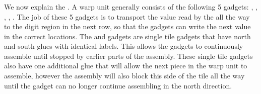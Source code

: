 \subsubsection{\warpunit}

We now explain the {\warpunit}. A warp unit generally consists of the following 5 gadgets: \prewarp,
\firstwarp, \warpbridge, \secondwarp, \postwarp. The job of these 5 gadgets is to transport the value
read by the {\cread} all the way to the digit region in the next row, so that the {\cwrite} gadgets
can write the next value in the correct locations. The {\firstwarp} and {\secondwarp} gadgets are single
tile gadgets that have north and south glues with identical labels. This allows the gadgets to continuously
assemble until stopped by earlier parts of the assembly. These single tile gadgets also have one additional glue
that will allow the next piece in the warp unit to assemble, however the assembly will also block this side of the tile
all the way until the gadget can no longer continue assembling in the north direction.

